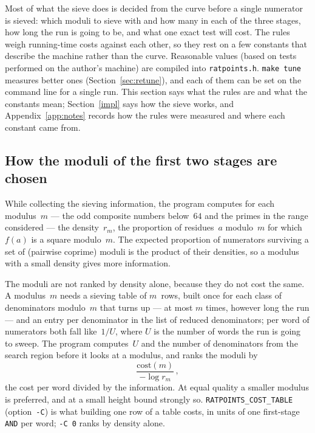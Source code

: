 \documentclass[12pt,a4paper,oneside]{amsart}
\begin{document}
Most of what the sieve does is decided from the curve before a single
numerator is sieved: which moduli to sieve with and how many in each of the
three stages, how long the run is going to be, and what one exact test will
cost. The rules weigh running-time costs against each other, so they rest on
a few constants that describe the machine rather than the curve. Reasonable
values (based on tests performed on the author's machine)
are compiled into \texttt{ratpoints.h}. \texttt{make tune} measures
better ones (Section~\ref{sec:retune}), and each of them can be set on the
command line for a single run. This section says what the rules are and
what the constants mean; Section~\ref{impl} says how the sieve works, and
Appendix~\ref{app:notes} records how the rules were measured and where each
constant came from.

\subsection{How the moduli of the first two stages are chosen}\label{sec:spchoice}

While collecting the sieving information, the program computes for each
modulus~$m$ --- the odd composite numbers below~$64$ and the primes in the
range considered --- the
density~$r_m$, the proportion of residues~$a$ modulo~$m$ for which $f(a)$
is a square modulo~$m$. The expected proportion of numerators surviving a set of
(pairwise coprime)
moduli is the product of their densities, so a modulus with a small density
gives more information.

The moduli are not ranked by density alone, because they do not cost the
same. A modulus~$m$ needs a sieving table of $m$~rows, built once for each
class of denominators modulo~$m$ that turns up --- at most $m$ times, however
long the run --- and an entry per denominator in the list of reduced
denominators; per word of numerators both fall like~$1/U$, where $U$ is the
number of words the run is going to sweep. The program computes~$U$ and the
number of denominators from the search region before it looks at a modulus,
and ranks the moduli by
\[ \frac{\text{cost}(m)}{-\log r_m} \,, \]
the cost per word divided by the information. At equal quality a smaller
modulus is preferred, and at a small height bound strongly so.
\texttt{RATPOINTS\_COST\_TABLE} (option~\verb+-C+) is what building one
row of a table costs, in units of one first-stage \texttt{AND} per word;
\verb+-C 0+ ranks by density alone.
\end{document}
